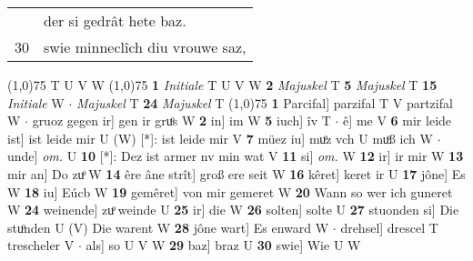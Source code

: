 \documentclass[8pt,a4paper,notitlepage]{article}
\begin{document}
\begin{table}[ht]
\begin{minipage}[t]{0.5\linewidth}
\begin{tabular}{rl}
 & der si gedrât hete baz.\\ 
30 & swie minneclîch diu vrouwe saz,\\ 
\end{tabular}
\scriptsize
\line(1,0){75} \newline
T U V W \newline
\line(1,0){75} \newline
\textbf{1} \textit{Initiale} T U V W  \textbf{2} \textit{Majuskel} T  \textbf{5} \textit{Majuskel} T  \textbf{15} \textit{Initiale} W   $\cdot$ \textit{Majuskel} T  \textbf{24} \textit{Majuskel} T  \newline
\line(1,0){75} \newline
\textbf{1} Parcifal] parzifal T V partzifal W  $\cdot$ gruoz gegen ir] gen ir gruͦs W \textbf{2} in] im W \textbf{5} iuch] îv T  $\cdot$ ê] me V \textbf{6} mir leide ist] ist leide mir U (W) [*]: ist leide mir  V \textbf{7} müez iu] muͦz vch U muͦß ich W  $\cdot$ unde] \textit{om.} U \textbf{10} [*]: Dez ist armer nv min wat V \textbf{11} si] \textit{om.} W \textbf{12} ir] ir mir W \textbf{13} mir an] Do zuͦ W \textbf{14} êre âne strît] groß ere seit W \textbf{16} kêret] keret ir U \textbf{17} jône] Es W \textbf{18} iu] Eúcb W \textbf{19} gemêret] von mir gemeret W \textbf{20} Wann so wer ich guneret W \textbf{24} weinende] zuͦ weinde U \textbf{25} ir] die W \textbf{26} solten] solte U \textbf{27} stuonden si] Die stuͦnden U (V) Die warent W \textbf{28} jône wart] Es enward W  $\cdot$ drehsel] drescel T trescheler V  $\cdot$ als] so U V W \textbf{29} baz] braz U \textbf{30} swie] Wie U W \newline
\end{minipage}
\end{table}
\end{document}
